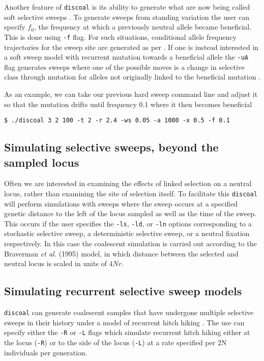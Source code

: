 \documentclass[12pt]{article}
\begin{document}
Another feature of \texttt{discoal} is its ability to generate what are now being called soft selective sweeps \cite{HermissonPennings2005,Przeworskietal2005}. To generate sweeps from standing variation the user can specify $f_0$, the frequency at which a previously neutral allele became beneficial. This is done using \texttt{-f} flag. For such situations, conditional allele frequency trajectories for the sweep site are generated as per \cite{Przeworskietal2005}. If one is instead interested in a soft sweep model with recurrent mutation towards a beneficial allele the \texttt{-uA} flag generates sweeps where one of the possible moves is a change in selective class through mutation for alleles not originally linked to the beneficial mutation \cite{PenningsHermisson2006}. 

As an example, we can take our previous hard sweep command line and adjust it so that the mutation drifts until frequency 0.1 where it then becomes beneficial

\begin{verbatim}
$ ./discoal 3 2 100 -t 2 -r 2.4 -ws 0.05 -a 1000 -x 0.5 -f 0.1
\end{verbatim}

\subsection*{Simulating selective sweeps, beyond the sampled locus}
Often we are interested in examining the effects of linked selection on a neutral locus, rather than examining the site of selection itself. To facilitate this \texttt{discoal} will perform simulations with sweeps where the sweep occurs at a specified genetic distance to the left of the locus sampled as well as the time of the sweep. This occurs if the user specifies the \texttt{-ls}, \texttt{-ld}, or \texttt{-ln} options corresponding to a stochastic selective sweep, a deterministic selective sweep, or a neutral fixation respectively. In this case the coalescent simulation is carried out according to the Braverman \emph{et al.} (1995) model, in which distance between the selected and neutral locus is scaled in units of $4Nr$.

\subsection*{Simulating recurrent selective sweep models}
\texttt{discoal} can generate coalescent samples that have undergone multiple selective sweeps in their history under a model of recurrent hitch hiking \cite{Bravermanetal1995}. The use can specify either the \texttt{-R} or \texttt{-L} flags which simulate recurrent hitch hiking either at the locus (\texttt{-R}) or to the side of the locus (\texttt{-L}) at a rate specified per 2N individuals per generation.
\end{document}
